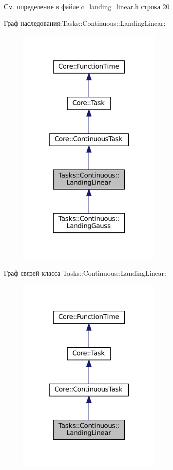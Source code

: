 См. определение в файле c\+\_\+landing\+\_\+linear.\+h строка 20



Граф наследования\+:Tasks\+:\+:Continuous\+:\+:Landing\+Linear\+:\nopagebreak
\begin{figure}[H]
\begin{center}
\leavevmode
\includegraphics[width=202pt]{class_tasks_1_1_continuous_1_1_landing_linear__inherit__graph}
\end{center}
\end{figure}


Граф связей класса Tasks\+:\+:Continuous\+:\+:Landing\+Linear\+:\nopagebreak
\begin{figure}[H]
\begin{center}
\leavevmode
\includegraphics[width=202pt]{class_tasks_1_1_continuous_1_1_landing_linear__coll__graph}
\end{center}
\end{figure}


